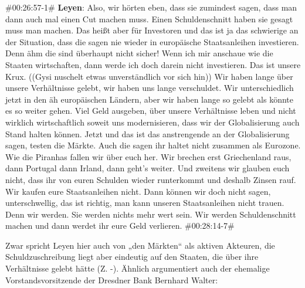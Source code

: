 \begin{description}
	\begin{linenumbers}[1]
		\item \#00:26:57-1\# \textbf{Leyen}: Also, wir hörten eben, dass sie zumindest sagen, dass man dann auch mal einen Cut machen muss. Einen Schuldenschnitt haben sie gesagt muss man machen. Das heißt aber für Investoren und das ist ja das schwierige an der Situation, dass die sagen nie wieder in europäische Staatsanleihen investieren. Denn ähm die sind überhaupt nicht sicher! Wenn ich mir anschaue wie die Staaten wirtschaften, dann werde ich doch darein nicht investieren. Das ist unsere Krux. ((Gysi nuschelt etwas unverständlich vor sich hin)) Wir haben lange über unsere Verhältnisse gelebt, wir haben uns lange verschuldet. Wir unterschiedlich jetzt in den äh europäischen Ländern, aber wir haben lange so gelebt als könnte es so weiter gehen. Viel Geld ausgeben, über unsere Verhältnisse leben und nicht wirklich wirtschaftlich soweit uns modernisieren, dass wir der Globalisierung auch Stand halten können. Jetzt und das ist das anstrengende an der Globalisierung sagen, testen die Märkte. Auch die sagen ihr haltet nicht zusammen als Eurozone. Wie die Piranhas fallen wir über euch her. Wir brechen erst Griechenland raus, dann Portugal dann Irland, dann geht's weiter. Und zweitens wir glauben euch nicht, dass ihr von euren Schulden wieder runterkommt und deshalb Zinsen rauf. Wir kaufen eure Staatsanleihen nicht. Dann können wir doch nicht sagen, unterschwellig, das ist richtig, man kann unseren Staatsanleihen nicht trauen. Denn wir werden. Sie werden nichts mehr wert sein. Wir werden Schuldenschnitt machen und dann werdet ihr eure Geld verlieren. \#00:28:14-7\# 
	\end{linenumbers}
\end{description}

Zwar spricht Leyen hier auch von „den Märkten“ als aktiven Akteuren, die Schuldzuschreibung liegt aber eindeutig auf den Staaten, die über ihre Verhältnisse gelebt hätte (Z. -). Ähnlich argumentiert auch der ehemalige Vorstandsvorsitzende der Dresdner Bank Bernhard Walter:

